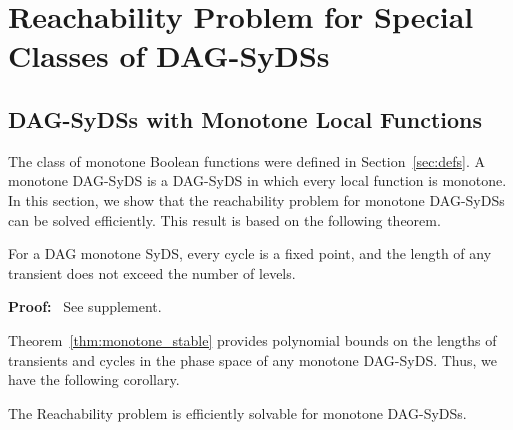 \section{Reachability Problem for Special Classes of DAG-SyDSs}
\label{sec:reach_special}

\subsection{DAG-SyDSs with Monotone Local Functions}
\label{sse:monotoner_functions}

The class of monotone Boolean functions were defined in
Section~\ref{sec:defs}.
A monotone DAG-SyDS is a DAG-SyDS in which every local
function is monotone.
In this section, we show that the reachability problem
for monotone DAG-SyDSs can be solved efficiently.
This result is based on the following theorem. 

\begin{theorem}\label{thm:monotone_stable}
For a DAG monotone SyDS, every cycle is a fixed point, 
and the length of any transient does not exceed the number of levels.
\end{theorem}

\noindent
\textbf{Proof:}~ See supplement.

\iffalse
\noindent
\textbf{Proof:}~ 
By induction on the number of levels for each level $i$, 
each level $i$ node is stable after at most $i$ steps.

From Lemma \ref{lem:level_zero_nodes}, every level 0 node is either
stable or alternating  at time 1.  The complement function is not
monotone, so a  level 0 node is cannot be alternating, and thus is
stable at time 1.

Suppose that all the incoming edges to a given node $v$ have stable
values at time $t$.  From Lemma \ref{lem:all_inputs_stable}, node
$v$ is either stable or alternating  at time $t+1$.  Since the local
transition function for node $v$ is monotone, and all the incoming
edges have stable values at time $t$, node $v$ is stable at time
$t+1$. \QED

We observe that that for every $L \geq 0$, there exists a DAG
monotone SyDS with a transient of length $L$.  Consider the SyDS
whose underlying graph is a directed chain of $L$ nodes.  The local
transition function of the level 0 node is the constant 1, and of
every other node is the {\em or} of its value and the value from
the incoming edge.  The configuration of all zeros takes $L$ steps
to reach the fixed point of all ones.
\fi

Theorem~\ref{thm:monotone_stable} provides polynomial bounds
on the lengths of transients and cycles in the phase space of any
monotone DAG-SyDS. Thus, we have the following corollary.

\begin{corollary}\label{cor:poly_monotone_dag_syds}
The Reachability problem is efficiently solvable for monotone
DAG-SyDSs.
\end{corollary}


